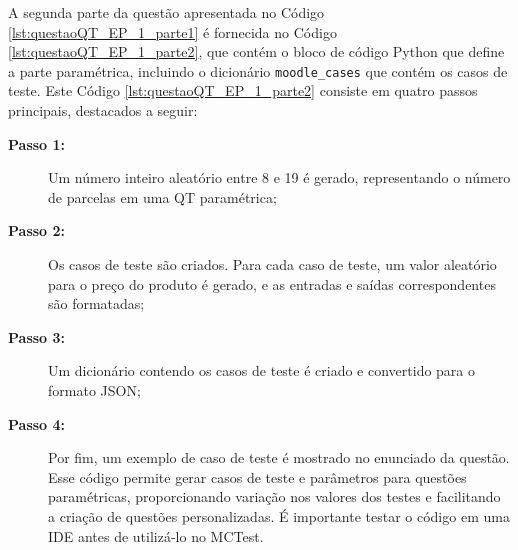 A segunda parte da questão apresentada no Código \ref{lst:questaoQT_EP_1_parte1} é fornecida no Código \ref{lst:questaoQT_EP_1_parte2}, que contém o bloco de código Python que define a parte paramétrica, incluindo o dicionário \verb|moodle_cases| que contém os casos de teste.
%
Este Código \ref{lst:questaoQT_EP_1_parte2} consiste em quatro passos principais, destacados a seguir:

\begin{description}
\item[\textbf{Passo 1:}] Um número inteiro aleatório entre 8 e 19 é gerado, representando o número de parcelas em uma QT paramétrica;
\item[\textbf{Passo 2:}] Os casos de teste são criados. Para cada caso de teste, um valor aleatório para o preço do produto é gerado, e as entradas e saídas correspondentes são formatadas;
\item[\textbf{Passo 3:}] Um dicionário contendo os casos de teste é criado e convertido para o formato JSON;
\item[\textbf{Passo 4:}] Por fim, um exemplo de caso de teste é mostrado no enunciado da questão. Esse código permite gerar casos de teste e parâmetros para questões paramétricas, proporcionando variação nos valores dos testes e facilitando a criação de questões personalizadas. É importante testar o código em uma IDE antes de utilizá-lo no MCTest.
\end{description}




